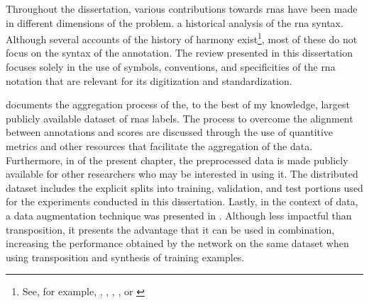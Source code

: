 
Throughout the dissertation, various contributions towards
\glspl{rna} have been made in different dimensions of the
problem.  a
historical analysis of the \gls{rna} syntax. Although
several accounts of the history of harmony
exist\footnote{See, for example,
\textcite{christensen2002tonality},
\textcite{grave1988praise}, \textcite{laitz2010graduate},
\textcite{sansallovich2013quintas}, or
\textcite{wason1985viennese}}, most of these do not focus on
the syntax of the annotation. The review presented in this
dissertation focuses solely in the use of symbols,
conventions, and specificities of the \gls{rna} notation
that are relevant for its digitization and standardization.

 documents the
aggregation process of the, to the best of my knowledge,
largest publicly available dataset of \glspl{rna} labels.
The process to overcome the alignment between annotations
and scores are discussed through the use of quantitive
metrics and other resources that facilitate the aggregation
of the data. Furthermore, in  of
the present chapter, the preprocessed data is made publicly
available for other researchers who may be interested in
using it. The distributed dataset includes the explicit
splits into training, validation, and test portions used for
the experiments conducted in this dissertation. Lastly, in
the context of data, a data augmentation technique was
presented in .
Although less impactful than transposition, it presents the
advantage that it can be used in combination, increasing the
performance obtained by the network on the same dataset when
using transposition and synthesis of training examples.

